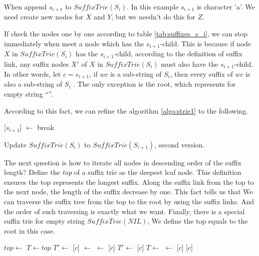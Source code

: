 \documentclass{article}
\begin{document}
When append $s_{i+1}$ to $SuffixTrie(S_i)$. In this example $s_{i+1}$ is character 'a'.
We need create new nodes for $X$ and $Y$, but we needn't do this
for $Z$.

If check the nodes one by one according to table \ref{tab:suffixes_s_i}, we can
stop immediately when meet a node which has the $s_{i+1}$-child. This is because
if node $X$ in $SuffixTrie(S_i)$ has the $s_{i+1}$-child, according to the
definition of suffix link, any suffix nodes $X'$ of $X$ in $SuffixTrie(S_i)$ must
also have the $s_{i+1}$-child. In other words, let $c=s_{i+1}$, if $wc$ is a sub-string
of $S_i$, then every suffix of $wc$ is also a sub-string of $S_i$ \cite{ukkonen95}.
The only exception is the root, which represents for empty string ``''.

According to this fact, we can refine the algorithm \ref{algo:strie1} to
the following.

\begin{algorithm}
  \begin{algorithmic}[1]
      \State {}[$s_{i+1}$] $\gets$ 
    \Else
      \State break
    \EndIf
  \EndFor
  \end{algorithmic}
  \caption{Update $SuffixTrie(S_i)$ to $SuffixTrie(S_{i+1})$, second version.}
  \label{algo:strie2}
\end{algorithm}

The next question is how to iterate all nodes
in descending order of the suffix length? Define the {\em top} of a suffix
trie as the deepest leaf node. This definition ensures the top represents
the longest suffix. Along the suffix link from the top to the next node,
the length of the suffix decrease by one. This fact tells us that
We can traverse the suffix tree from the top
to the root by using the suffix links. And the order of such traversing
is exactly what we want.
Finally, there is a special suffix trie for empty string $SuffixTrie(NIL)$,
We define the top equals to the root in this case.

\begin{algorithmic}
   
    \State $top \gets$ 
  \EndIf
  \State $T \gets top$
  \State $T' \gets$  
    \State {}[$c$] $\gets$ 
    \State {} $\gets$ [$c$]
    \State $T' \gets$ [$c$]
    \State $T \gets$ 
  \EndWhile
    \State {} $\gets$ [$c$]
  \EndIf
  \State \Return {}[$c$] 
\EndFunction
\end{algorithmic}
\end{document}

